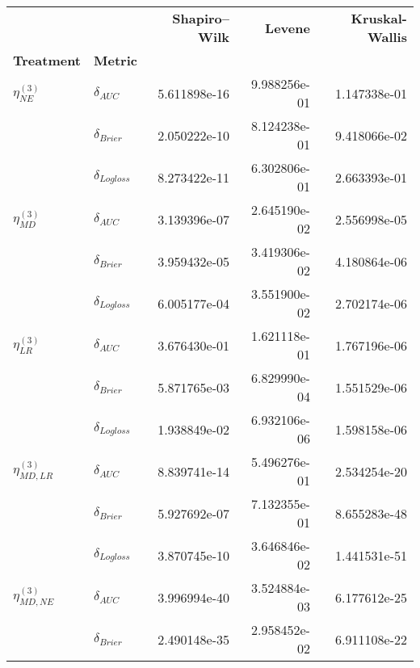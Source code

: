     
    \begin{table}[!h]
    \centering
    \begin{tabular}{l|lrrr}
    \toprule
                              &                    &  \textbf{Shapiro–Wilk} &  \textbf{Levene} &  \textbf{Kruskal-Wallis} \\
    \textbf{Treatment} & \textbf{Metric} &                        &                  &                          \\
    \midrule
    $\eta^{(3)}_{NE}$ & $\delta_{AUC}$ &           5.611898e-16 &     9.988256e-01 &             1.147338e-01 \\
                              & $\delta_{Brier}$ &           2.050222e-10 &     8.124238e-01 &             9.418066e-02 \\
                              & $\delta_{Logloss}$ &           8.273422e-11 &     6.302806e-01 &             2.663393e-01 \\
    $\eta^{(3)}_{MD}$ & $\delta_{AUC}$ &           3.139396e-07 &     2.645190e-02 &             2.556998e-05 \\
                              & $\delta_{Brier}$ &           3.959432e-05 &     3.419306e-02 &             4.180864e-06 \\
                              & $\delta_{Logloss}$ &           6.005177e-04 &     3.551900e-02 &             2.702174e-06 \\
    $\eta^{(3)}_{LR}$ & $\delta_{AUC}$ &           3.676430e-01 &     1.621118e-01 &             1.767196e-06 \\
                              & $\delta_{Brier}$ &           5.871765e-03 &     6.829990e-04 &             1.551529e-06 \\
                              & $\delta_{Logloss}$ &           1.938849e-02 &     6.932106e-06 &             1.598158e-06 \\
    $\eta^{(3)}_{MD, LR}$ & $\delta_{AUC}$ &           8.839741e-14 &     5.496276e-01 &             2.534254e-20 \\
                              & $\delta_{Brier}$ &           5.927692e-07 &     7.132355e-01 &             8.655283e-48 \\
                              & $\delta_{Logloss}$ &           3.870745e-10 &     3.646846e-02 &             1.441531e-51 \\
    $\eta^{(3)}_{MD, NE}$ & $\delta_{AUC}$ &           3.996994e-40 &     3.524884e-03 &             6.177612e-25 \\
                              & $\delta_{Brier}$ &           2.490148e-35 &     2.958452e-02 &             6.911108e-22 \\

\end{tabular}
\end{table}
